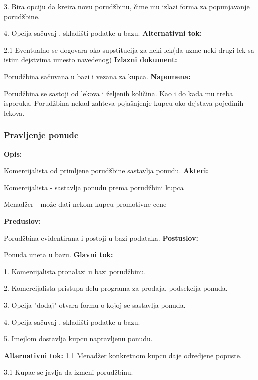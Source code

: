 3. Bira opciju da kreira novu porudžbinu, čime mu izlazi forma za popunjavanje porudžbine.

4. Opcija sačuvaj , skladišti podatke u bazu.
\newline
\textbf{Alternativni tok:}

2.1  Eventualno se dogovara oko supstitucija za neki lek(da uzme neki drugi lek sa istim dejstvima umesto navedenog)
\newline
\textbf{Izlazni dokument:}

Porudžbina sačuvana u bazi i vezana za kupca.
\newline
\textbf{Napomena:}

Porudžbina se sastoji od lekova i željenih količina. Kao i do kada mu treba isporuka. Porudžbina nekad zahteva pojašnjenje kupcu oko dejstava pojedinih lekova.

\clearpage

\subsubsection{Pravljenje ponude}

\textbf{Opis:}

Komercijalista od primljene porudžbine sastavlja ponudu.
\newline
\textbf{Akteri:}

Komercijalista - sastavlja ponudu prema porudžbini kupca

Menadžer - može dati nekom kupcu promotivne cene

\textbf{Preduslov:}

Porudžbina evidentirana i postoji u bazi podataka.
\newline
\textbf{Postuslov:}

Ponuda uneta u bazu.
\newline
\textbf{Glavni tok:}

1. Komercijalista pronalazi u bazi porudžbinu.

2. Komercijalista pristupa delu programa za prodaja, podsekcija ponuda.

3. Opcija "dodaj" otvara formu o kojoj se sastavlja ponuda.

4. Opcija sačuvaj , skladišti podatke u bazu.

5. Imejlom dostavlja kupcu napravljenu ponudu.

\textbf{Alternativni tok:}
1.1 Menadžer konkretnom kupcu daje odredjene popuste.

3.1 Kupac se javlja da izmeni porudžbinu.

